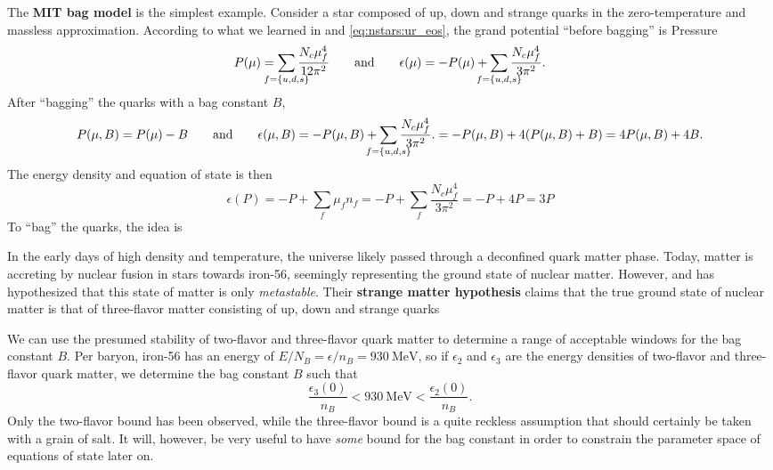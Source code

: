 The \textbf{MIT bag model} is the simplest example.
Consider a star composed of up, down and strange quarks in the zero-temperature and massless approximation.
According to what we learned in  and \eqref{eq:nstars:ur_eos}, the grand potential ``before bagging'' is
Pressure
\begin{equation}
	P(\mu) = \smashoperator{\sum_{f=\{u,d,s\}}} \frac{N_c \mu_f^4}{12 \pi^2}
	\qquad \text{and} \qquad
	\epsilon(\mu) = -P(\mu) + \smashoperator{\sum_{f=\{u,d,s\}}} \frac{N_c \mu_f^4}{3 \pi^2}.
\end{equation}
After ``bagging'' the quarks with a bag constant $B$,
\begin{equation}
	P(\mu,B) = P(\mu) - B
	\qquad \text{and} \qquad
	\epsilon(\mu,B) = -P(\mu,B) + \smashoperator{\sum_{f=\{u,d,s\}}} \frac{N_c \mu_f^4}{3 \pi^2}.
	                = -P(\mu,B) + 4 (P(\mu,B) + B) = 4 P(\mu,B) + 4 B.
\end{equation}
The energy density and equation of state is then
\begin{equation}
	\epsilon(P) = -P + \sum_f \mu_f n_f = -P + \sum_f \frac{N_c \mu_f^4}{3 \pi^2} = -P + 4P = 3P
\end{equation}
To ``bag'' the quarks, the idea is 

In the early days of high density and temperature, the universe likely passed through a deconfined quark matter phase.
Today, matter is accreting by nuclear fusion in stars towards iron-56, seemingly representing the ground state of nuclear matter.
However, \cite{ref:strange_hypothesis_bodmer} and \cite{ref:strange_hypothesis_witten} has hypothesized that this state of matter is only \emph{metastable}.
Their \textbf{strange matter hypothesis} claims that the true ground state of nuclear matter is that of three-flavor matter consisting of up, down and strange quarks

We can use the presumed stability of two-flavor and three-flavor quark matter to determine a range of acceptable windows for the bag constant $B$.
Per baryon, iron-56 has an energy of $E/N_B = \epsilon/n_B = \SI{930}{\mega\electronvolt}$,
so if $\epsilon_2$ and $\epsilon_3$ are the energy densities of two-flavor and three-flavor quark matter,
we determine the bag constant $B$ such that
\begin{equation}
	\frac{\epsilon_3(0)}{n_B} < \SI{930}{\mega\electronvolt} < \frac{\epsilon_2(0)}{n_B} .
\label{eq:lsm:bag_stability}
\end{equation}
Only the two-flavor bound has been observed,
while the three-flavor bound is a quite reckless assumption that should certainly be taken with a grain of salt.
It will, however, be very useful to have \emph{some} bound for the bag constant in order to constrain the parameter space of equations of state later on.

